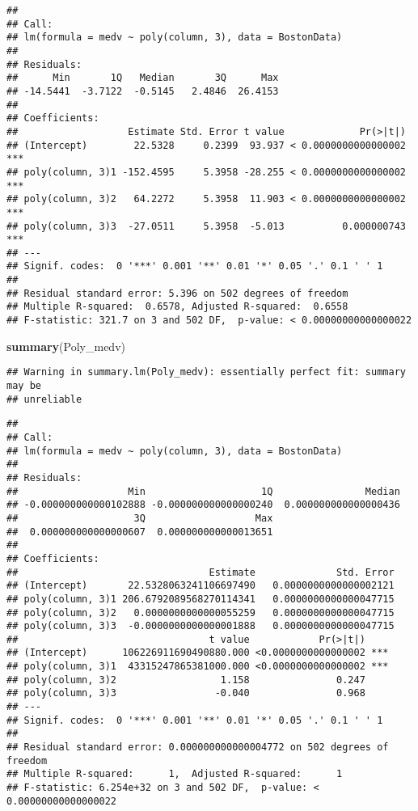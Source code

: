 \documentclass[]{article}
\newenvironment{Shaded}{\begin{snugshade}}{\end{snugshade}}
\newcommand{\KeywordTok}[1]{\textcolor[rgb]{0.13,0.29,0.53}{\textbf{#1}}}
\newcommand{\NormalTok}[1]{#1}
\begin{document}
\begin{verbatim}
## 
## Call:
## lm(formula = medv ~ poly(column, 3), data = BostonData)
## 
## Residuals:
##      Min       1Q   Median       3Q      Max 
## -14.5441  -3.7122  -0.5145   2.4846  26.4153 
## 
## Coefficients:
##                   Estimate Std. Error t value             Pr(>|t|)    
## (Intercept)        22.5328     0.2399  93.937 < 0.0000000000000002 ***
## poly(column, 3)1 -152.4595     5.3958 -28.255 < 0.0000000000000002 ***
## poly(column, 3)2   64.2272     5.3958  11.903 < 0.0000000000000002 ***
## poly(column, 3)3  -27.0511     5.3958  -5.013          0.000000743 ***
## ---
## Signif. codes:  0 '***' 0.001 '**' 0.01 '*' 0.05 '.' 0.1 ' ' 1
## 
## Residual standard error: 5.396 on 502 degrees of freedom
## Multiple R-squared:  0.6578, Adjusted R-squared:  0.6558 
## F-statistic: 321.7 on 3 and 502 DF,  p-value: < 0.00000000000000022
\end{verbatim}

\begin{Shaded}
\begin{Highlighting}[]
\KeywordTok{summary}\NormalTok{(Poly_medv)}
\end{Highlighting}
\end{Shaded}

\begin{verbatim}
## Warning in summary.lm(Poly_medv): essentially perfect fit: summary may be
## unreliable
\end{verbatim}

\begin{verbatim}
## 
## Call:
## lm(formula = medv ~ poly(column, 3), data = BostonData)
## 
## Residuals:
##                   Min                    1Q                Median 
## -0.000000000000102888 -0.000000000000000240  0.000000000000000436 
##                    3Q                   Max 
##  0.000000000000000607  0.000000000000013651 
## 
## Coefficients:
##                                 Estimate              Std. Error
## (Intercept)       22.5328063241106697490   0.0000000000000002121
## poly(column, 3)1 206.6792089568270114341   0.0000000000000047715
## poly(column, 3)2   0.0000000000000055259   0.0000000000000047715
## poly(column, 3)3  -0.0000000000000001888   0.0000000000000047715
##                                 t value            Pr(>|t|)    
## (Intercept)      106226911690490880.000 <0.0000000000000002 ***
## poly(column, 3)1  43315247865381000.000 <0.0000000000000002 ***
## poly(column, 3)2                  1.158               0.247    
## poly(column, 3)3                 -0.040               0.968    
## ---
## Signif. codes:  0 '***' 0.001 '**' 0.01 '*' 0.05 '.' 0.1 ' ' 1
## 
## Residual standard error: 0.000000000000004772 on 502 degrees of freedom
## Multiple R-squared:      1,  Adjusted R-squared:      1 
## F-statistic: 6.254e+32 on 3 and 502 DF,  p-value: < 0.00000000000000022
\end{verbatim}
\end{document}
